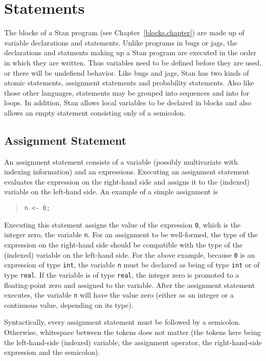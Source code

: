 \documentclass[10pt]{report}
\newcommand{\Stan}{Stan\xspace}
\newcommand{\acronym}[1]{{\sc #1}\xspace}
\newcommand{\BUGS}{\acronym{bugs}}
\newcommand{\JAGS}{\acronym{jags}}
\newcommand{\code}[1]{{\tt #1}}
\newcommand{\refchapter}[1]{Chapter~\ref{#1.chapter}}
\begin{document}
\chapter{Statements}

The blocks of a \Stan program (see \refchapter{blocks}) are made up of
variable declarations and statements.  Unlike programs in \BUGS or
\JAGS, the declarations and statments making up a \Stan program are
executed in the order in which they are written.  Thus variables need
to be defined before they are used, or there will be undefiend
behavior.  Like \BUGS and \JAGS, \Stan has two kinds of atomic
statements, assignment statements and probability statements.  Also
like those other languages, statements may be grouped into sequences
and into for loops.  In addition, \Stan allows local variables to be
declared in blocks and also allows an empty statement consisting only
of a semicolon.

\section{Assignment Statement}

An assignment statement consists of a variable (possibly multivariate
with indexing information) and an expressions.  Executing an
assignment statement evaluates the expression on the right-hand side
and assigns it to the (indexed) variable on the left-hand side.  An
example of a simple assignment is
%
\begin{quote}
\code{n <- 0;}
\end{quote}
%
Executing this statement assigns the value of the expression \code{0},
which is the integer zero, the variable \code{n}.  For an assignment
to be well-formed, the type of the expression on the right-hand side
should be compatible with the type of the (indexed) variable on the
left-hand side.  For the above example, because \code{0} is an
expression of type \code{int}, the variable \code{n} must be declared
as being of type \code{int} or of type \code{real}.  If the variable
is of type \code{real}, the integer zero is promoted to a
floating-point zero and assigned to the variable.  After the
assignment statement executes, the variable \code{n} will have the
value zero (either as an integer or a continuous value, depending on
its type).

Syntactically, every assignment statement must be followed by a
semicolon.  Otherwise, whitespace between the tokens does not matter
(the tokens here being the left-hand-side (indexed) variable, the
assignment operator, the right-hand-side expression and the
semicolon).
\end{document}
